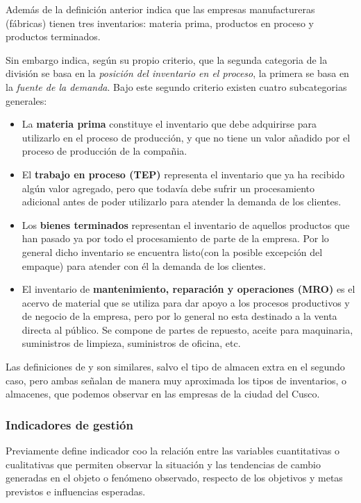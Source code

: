 Adem\'as de la definici\'on anterior \cite{meza} indica que las empresas manufactureras
(f\'abricas) tienen tres inventarios: materia prima, productos en proceso y productos
terminados.

Sin embargo \cite{chapman} indica, seg\'un su propio criterio, que la segunda categoria de la divisi\'on se basa
en la \emph{posici\'on del inventario en el proceso}, la primera se basa en la
\emph{fuente de la demanda}. Bajo este segundo criterio existen cuatro subcategorias
generales:
\begin{itemize}
  \item La \textbf{materia prima} constituye el inventario que debe adquirirse para
        utilizarlo en el proceso de producci\'on, y que no tiene un valor a\~nadido
        por el proceso de producci\'on de la compa\~nia.
  \item El \textbf{trabajo en proceso (TEP)} representa el inventario que ya ha recibido
        alg\'un valor agregado, pero que todav\'ia debe sufrir un procesamiento
        adicional antes de poder utilizarlo para atender la demanda de los clientes.
  \item Los \textbf{bienes terminados} representan el inventario de aquellos productos
        que han pasado ya por todo el procesamiento de parte de la empresa. Por lo general
        dicho inventario se encuentra listo(con la posible excepci\'on del empaque)
        para atender con \'el la demanda de los clientes.
  \item El inventario de \textbf{mantenimiento, reparaci\'on y operaciones (MRO)}
        es el acervo de material que se utiliza para dar apoyo a los procesos productivos
        y de negocio de la empresa, pero por lo general no esta destinado a la venta
        directa al p\'ublico. Se compone de partes de repuesto, aceite para maquinaria,
        suministros de limpieza, suministros de oficina, etc.
\end{itemize}

Las definiciones de \cite{meza} y \citep{chapman} son similares, salvo el tipo de
almacen extra en el segundo caso, pero ambas se\~nalan de manera muy aproximada los
tipos de inventarios, o almacenes, que podemos observar en las empresas de la ciudad
del Cusco.

\subsubsection{Indicadores de gesti\'on}
Previamente \cite{beltran} define indicador coo la relaci\'on entre las variables
cuantitativas o cualitativas que permiten observar la situaci\'on y las tendencias
de cambio generadas en el objeto o fen\'omeno observado, respecto de los objetivos
y metas previstos e influencias esperadas.


